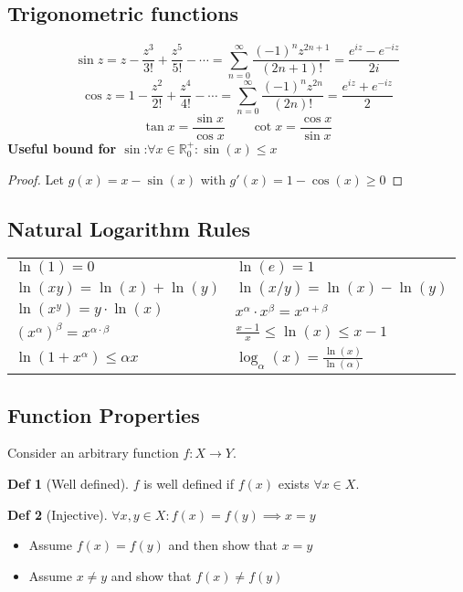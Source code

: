 \documentclass[a4paper, 10pt]{article}
\theoremstyle{definition}
\newtheorem*{definition}{Def}
\newcommand{\R}{\mathbb{R}}
\begin{document}
\subsection*{Trigonometric functions}
\[\sin z = z - \frac{z^3}{3!} + \frac{z^5}{5!} - \cdots = \sum_{n = 0}^\infty \frac{(-1)^n z^{2n + 1}}{(2n + 1)!} = \frac{e^{iz}-e^{-iz}}{2i}\]
\[\cos z = 1 - \frac{z^2}{2!} + \frac{z^4}{4!} - \cdots = \sum_{n = 0}^\infty \frac{(-1)^n z^{2n}}{(2n)!} = \frac{e^{iz}+e^{-iz}}{2}\]
\[\tan x = \frac{\sin x}{\cos x} \qquad \cot x = \frac{\cos x}{\sin x}\]
\textbf{Useful bound for \(\sin\)}:\(\forall x \in \R^+_0: \sin(x) \leq x\)
\begin{proof}
    Let \(g(x) = x - \sin(x)\) with \(g'(x) = 1 - \cos(x) \geq 0\)
\end{proof}

\subsection*{Natural Logarithm Rules}
\begin{tabularx}{\linewidth}{XX}
    $\ln(1) = 0$ & $\ln(e) = 1$ \\
    $\ln(xy) = \ln(x) + \ln(y)$ & $\ln(x/y) = \ln(x) - \ln(y)$ \\
    $\ln(x^y) = y \cdot \ln(x)$ & $x^\alpha \cdot x^\beta = x^{\alpha + \beta}$ \\
    $(x^\alpha)^\beta = x^{\alpha \cdot \beta}$ & $\frac{x - 1}{x} \leq \ln(x) \leq x - 1$ \\
    $\ln(1 + x^\alpha) \leq \alpha x$ & $\log_\alpha(x) = \frac{\ln(x)}{\ln(\alpha)}$
\end{tabularx}

\subsection*{Function Properties}
Consider an arbitrary function $f: X \to Y$.
\begin{definition}[Well defined]
    $f$ is well defined if $f(x)$ exists $\forall x \in X$.
\end{definition}

\begin{definition}[Injective]
    $\forall x, y \in X: f(x) = f(y) \implies x = y$
    \begin{itemize}
        \item Assume $f(x)= f(y)$ and then show that $x = y$
        \item Assume $x \neq y$ and show that $f(x) \neq f(y)$
    \end{itemize}
\end{definition}
\end{document}
